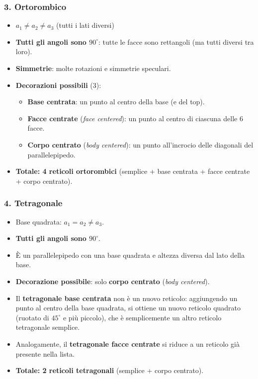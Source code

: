 \subsubsection{3. Ortorombico}
\begin{itemize}
    \item $a_1 \neq a_2 \neq a_3$ (tutti i lati diversi)
    \item \textbf{Tutti gli angoli sono $90^\circ$}: tutte le facce sono rettangoli (ma tutti diversi tra loro).
    \item \textbf{Simmetrie}: molte rotazioni e simmetrie speculari.
    \item \textbf{Decorazioni possibili} (3):
    \begin{itemize}
        \item \textbf{Base centrata}: un punto al centro della base (e del top).
        \item \textbf{Facce centrate} (\textit{face centered}): un punto al centro di ciascuna delle 6 facce.
        \item \textbf{Corpo centrato} (\textit{body centered}): un punto all'incrocio delle diagonali del parallelepipedo.
    \end{itemize}
    \item \textbf{Totale: 4 reticoli ortorombici} (semplice + base centrata + facce centrate + corpo centrato).
\end{itemize}

\subsubsection{4. Tetragonale}
\begin{itemize}
    \item Base quadrata: $a_1 = a_2 \neq a_3$.
    \item \textbf{Tutti gli angoli sono $90^\circ$}.
    \item È un parallelepipedo con una base quadrata e altezza diversa dal lato della base.
    \item \textbf{Decorazione possibile}: solo \textbf{corpo centrato} (\textit{body centered}).
    \item Il \textbf{tetragonale base centrata} non è un nuovo reticolo: aggiungendo un punto al centro della base quadrata, si ottiene un nuovo reticolo quadrato (ruotato di $45^\circ$ e più piccolo), che è semplicemente un altro reticolo tetragonale semplice.
    \item Analogamente, il \textbf{tetragonale facce centrate} si riduce a un reticolo già presente nella lista.
    \item \textbf{Totale: 2 reticoli tetragonali} (semplice + corpo centrato).
\end{itemize}

